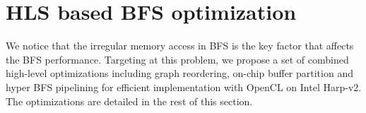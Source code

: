 \section{HLS based BFS optimization} \label{sec:bfs-opt}
We notice that the irregular memory access in BFS is the key 
factor that affects the BFS performance. Targeting at this problem, 
we propose a set of combined high-level optimizations including graph 
reordering, on-chip buffer partition 
and hyper BFS pipelining for efficient implementation 
with OpenCL on Intel Harp-v2. The optimizations are 
detailed in the rest of this section. 

%


